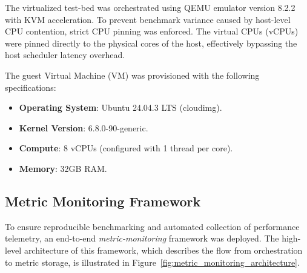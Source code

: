 The virtualized test-bed was orchestrated using QEMU emulator version 8.2.2 with KVM acceleration.
To prevent benchmark variance caused by host-level CPU contention, strict CPU pinning was enforced.
The virtual CPUs (vCPUs) were pinned directly to the physical cores of the host, effectively bypassing the host scheduler latency overhead.

The guest Virtual Machine (VM) was provisioned with the following specifications:
\begin{itemize}
    \item \textbf{Operating System}: Ubuntu 24.04.3 LTS (cloudimg).
    \item \textbf{Kernel Version}: 6.8.0-90-generic.
    \item \textbf{Compute}: 8 vCPUs (configured with 1 thread per core).
    \item \textbf{Memory}: 32GB RAM.
\end{itemize}

\subsection{Metric Monitoring Framework} \label{subsec:metric_monitoring}


To ensure reproducible benchmarking and automated collection of performance telemetry, an end-to-end \textit{metric-monitoring} framework was deployed.
The high-level architecture of this framework, which describes the flow from orchestration to metric storage, is illustrated in Figure~\ref{fig:metric_monitoring_architecture}.

